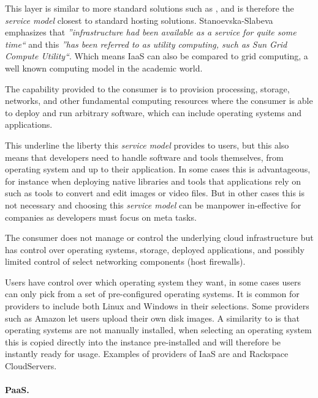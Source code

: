 This layer is similar to more standard solutions such as ,
and is therefore the \emph{service model} closest to standard hosting solutions.
Stanoevska-Slabeva~\cite{introduction:wozniak10} emphasizes that
\emph{''infrastructure had been available as a service for quite some time``} and this 
\emph{''has been referred to as utility computing, such as Sun Grid Compute Utility``}.
Which means IaaS can also be compared to grid computing, 
a well known computing model in the academic world.
\epigraph{The capability provided to the consumer is to provision 
  processing, storage, networks, and other fundamental computing resources where the 
  consumer is able to deploy and run arbitrary software, which can include operating 
  systems and applications.
}{\citet{nist:mell11}}
This underline the liberty this \emph{service model} provides to users, but this also means
that developers need to handle software and tools themselves, from operating system and
up to their application. In some cases this is advantageous, for instance when deploying 
native libraries and tools that applications rely on such as tools to convert and edit
images or video files. But in other cases this is not necessary and choosing this \emph{service model}
can be manpower in-effective for companies as developers must focus on meta tasks.
\epigraph{The consumer does not manage or control the underlying cloud 
  infrastructure but has control over operating systems, storage, deployed applications, and 
  possibly limited control of select networking components (\eg host firewalls).
}{\citet{nist:mell11}}
Users have control over which operating system they want, in some cases users
can only pick from a set of pre-configured operating systems.
It is common for providers to include both Linux and Windows in their selections.
Some providers such as Amazon let users upload their own disk images.
A similarity to  is that operating systems are not manually installed,
when selecting an operating system this is copied directly into the instance pre-installed
and will therefore be instantly ready for usage.
Examples of providers of IaaS are   and Rackspace CloudServers.

\paragraph{PaaS.}


